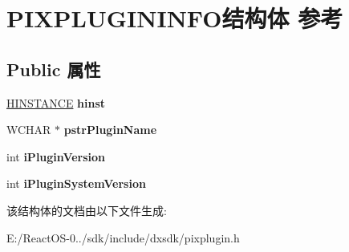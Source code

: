 \hypertarget{struct_p_i_x_p_l_u_g_i_n_i_n_f_o}{}\section{P\+I\+X\+P\+L\+U\+G\+I\+N\+I\+N\+F\+O结构体 参考}
\label{struct_p_i_x_p_l_u_g_i_n_i_n_f_o}
\subsection*{Public 属性}
\begin{DoxyCompactItemize}
\item 
\mbox{\label{struct_p_i_x_p_l_u_g_i_n_i_n_f_o_adaaa11feea33b75be25059b1d10d50b3}} 
\hyperlink{interfacevoid}{H\+I\+N\+S\+T\+A\+N\+CE} {\bfseries hinst}
\item 
\mbox{\label{struct_p_i_x_p_l_u_g_i_n_i_n_f_o_a83560f5a6daf782280d5b97495e83541}} 
W\+C\+H\+AR $\ast$ {\bfseries pstr\+Plugin\+Name}
\item 
\mbox{\label{struct_p_i_x_p_l_u_g_i_n_i_n_f_o_a41778895a4961893be8406cd0f070410}} 
int {\bfseries i\+Plugin\+Version}
\item 
\mbox{\label{struct_p_i_x_p_l_u_g_i_n_i_n_f_o_a2f953772717e057e0b4a4537ef91b5dd}} 
int {\bfseries i\+Plugin\+System\+Version}
\end{DoxyCompactItemize}


该结构体的文档由以下文件生成\+:\begin{DoxyCompactItemize}
\item 
E\+:/\+React\+O\+S-\/0../sdk/include/dxsdk/pixplugin.\+h\end{DoxyCompactItemize}
